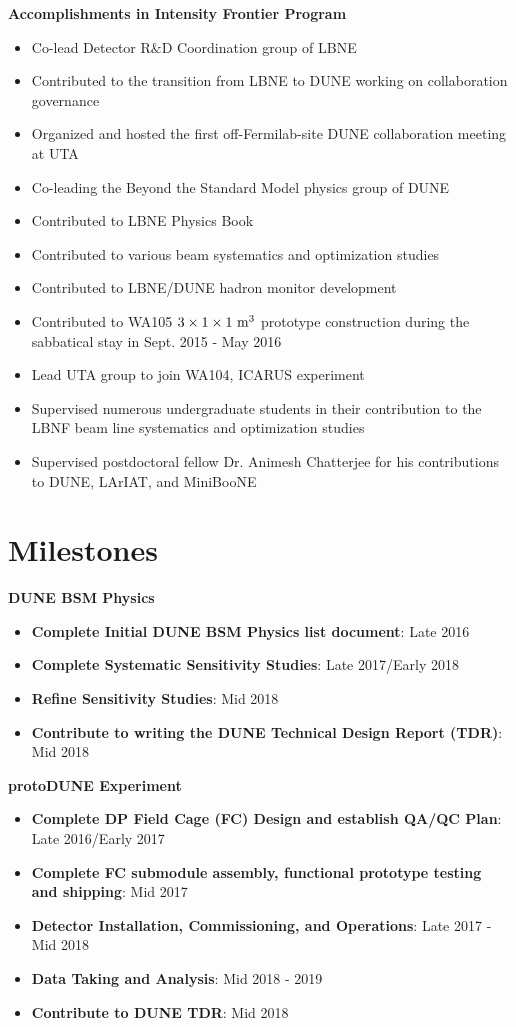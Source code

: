 \noindent\textbf{Accomplishments in Intensity Frontier Program}
\begin{itemize}[noitemsep,nolistsep]
\item{Co-lead Detector R$\&$D Coordination group of LBNE}
\item{Contributed to the transition from LBNE to DUNE working on collaboration governance}
\item{Organized and hosted the first off-Fermilab-site DUNE collaboration meeting at UTA}
\item{Co-leading the Beyond the Standard Model physics group of DUNE}
\item{Contributed to LBNE Physics Book}
\item{Contributed to various beam systematics and optimization studies}
\item{Contributed to LBNE/DUNE hadron monitor development}
\item{Contributed to WA105 $3\times 1 \times 1~{\rm m^{3}}$ prototype construction during the sabbatical stay in Sept. 2015 - May 2016}
\item{Lead UTA group to join WA104, ICARUS experiment}
\item {Supervised numerous undergraduate students in their contribution to the LBNF beam line systematics and optimization studies}
\item {Supervised postdoctoral fellow Dr. Animesh Chatterjee for his contributions to DUNE, LArIAT, and MiniBooNE}
\end{itemize}

\section*{\textbf{Milestones}}
\noindent\textbf{DUNE BSM Physics}
\begin{itemize}[noitemsep,nolistsep]
\item{\textbf{Complete Initial DUNE BSM Physics list document}}: Late 2016
\item{\textbf{Complete Systematic Sensitivity Studies}}: Late 2017/Early 2018
\item{\textbf{Refine Sensitivity Studies}}: Mid 2018
\item{\textbf{Contribute to writing the DUNE Technical Design Report (TDR)}}: Mid 2018
\end{itemize}

\noindent\textbf{protoDUNE Experiment}
\begin{itemize}[noitemsep,nolistsep]
\item{\textbf{Complete DP Field Cage (FC) Design and establish QA/QC Plan}}: Late 2016/Early 2017
\item{\textbf{Complete FC submodule assembly, functional prototype testing and shipping}}: Mid 2017
\item{\textbf{Detector Installation, Commissioning, and Operations}}: Late 2017 - Mid 2018
\item{\textbf{Data Taking and Analysis}}: Mid 2018 - 2019
\item{\textbf{Contribute to DUNE TDR}}: Mid 2018
\end{itemize}

